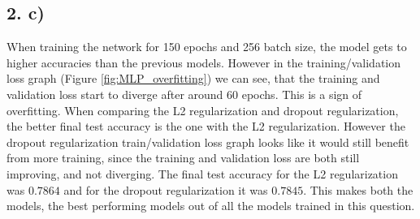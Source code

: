 \documentclass[11pt]{article}
\begin{document}
\subsection{2. c)}
When training the network for 150 epochs and 256 batch size, the model gets to higher accuracies than the previous models.
However in the training/validation loss graph (Figure \ref{fig:MLP_overfitting}) we can see, that the training and validation loss start to diverge after around 60 epochs.
This is a sign of overfitting.
When comparing the L2 regularization and dropout regularization, the better final test accuracy is the one with the L2 regularization.
However the dropout regularization train/validation loss graph looks like it would still benefit from more training, since the training and validation loss are both still improving, and not diverging.
The final test accuracy for the L2 regularization was $0.7864$ and for the dropout regularization it was $0.7845$.
This makes both the models, the best performing models out of all the models trained in this question.
\end{document}
